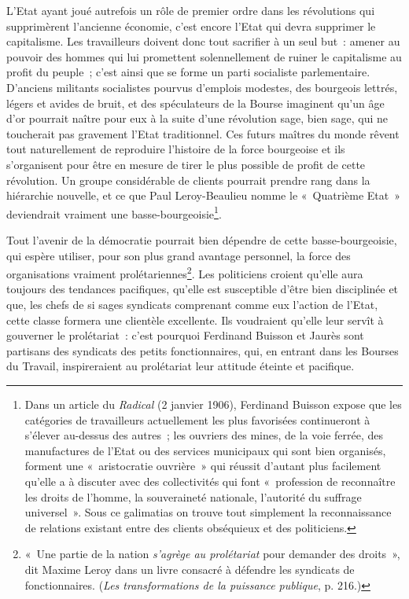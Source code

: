 \documentclass[french,twoside]{book} %
\begin{document}
L’Etat ayant joué autrefois un rôle de premier ordre dans les révolutions qui supprimèrent l’ancienne économie, c’est encore l’Etat qui devra supprimer le capitalisme. Les travailleurs doivent donc tout sacrifier à un seul but : amener au pouvoir des hommes qui lui promettent  solennellement de ruiner le capitalisme au profit du peuple ; c’est ainsi que se forme un parti socialiste parlementaire. D’anciens militants socialistes pourvus d’emplois modestes, des bourgeois lettrés, légers et avides de bruit, et des spéculateurs de la Bourse imaginent qu’un âge d’or pourrait naître pour eux à la suite d’une révolution sage, bien sage, qui ne toucherait pas gravement l’Etat traditionnel. Ces futurs maîtres du monde rêvent tout naturellement de reproduire l’histoire de la force bourgeoise et ils s’organisent pour être en mesure de tirer le plus possible de profit de cette révolution. Un groupe considérable de clients pourrait prendre rang dans la hiérarchie nouvelle, et ce que Paul Leroy-Beaulieu nomme le « Quatrième Etat » deviendrait vraiment une basse-bourgeoisie\footnote{ \noindent Dans un article du \emph{Radical} (2 janvier 1906), Ferdinand Buisson expose que les catégories de travailleurs actuellement les plus favorisées continueront à s’élever au-dessus des autres ; les ouvriers des mines, de la voie ferrée, des manufactures de l’Etat ou des services municipaux qui sont bien organisés, forment une « aristocratie ouvrière » qui réussit d’autant plus facilement qu’elle a à discuter avec des collectivités qui font « profession de reconnaître les droits de l’homme, la souveraineté nationale, l’autorité du suffrage universel ». Sous ce galimatias on trouve tout simplement la reconnaissance de relations existant entre des clients obséquieux et des politiciens.
 }.\par
Tout l’avenir de la démocratie pourrait bien dépendre de cette basse-bourgeoisie, qui espère utiliser, pour son plus grand avantage personnel, la force des organisations  vraiment prolétariennes\footnote{ \noindent « Une partie de la nation \emph{s’agrège au prolétariat} pour demander des droits », dit Maxime Leroy dans un livre consacré à défendre les syndicats de fonctionnaires. (\emph{Les transformations de la puissance publique}, p. 216.)
 }. Les politiciens croient qu’elle aura toujours des tendances pacifiques, qu’elle est susceptible d’être bien disciplinée et que, les chefs de si sages syndicats comprenant comme eux l’action de l’Etat, cette classe formera une clientèle excellente. Ils voudraient qu’elle leur servît à gouverner le prolétariat : c’est pourquoi Ferdinand Buisson et Jaurès sont partisans des syndicats des petits fonctionnaires, qui, en entrant dans les Bourses du Travail, inspireraient au prolétariat leur attitude éteinte et pacifique.\par
\end{document}
